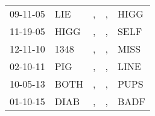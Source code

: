 \begin{supertabular}{lllll}
 09-11-05 &   LIE &  , &  , &  HIGG \\
 11-19-05 &  HIGG &  , &  , &  SELF \\
 12-11-10 &  1348 &  , &  , &  MISS \\
 02-10-11 &   PIG &  , &  , &  LINE \\
 10-05-13 &  BOTH &  , &  , &  PUPS \\
 01-10-15 &  DIAB &  , &  , &  BADF \\
\end{supertabular}
